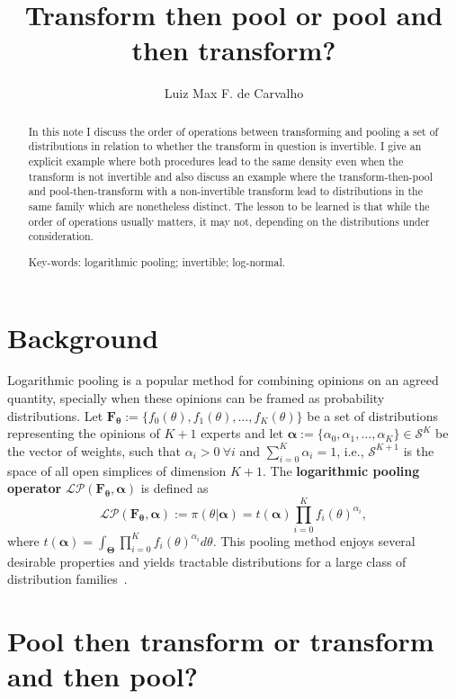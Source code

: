 \documentclass[a4paper, notitlepage, 10pt]{article}
\title{\vspace{-9ex}\centering \bf Transform then pool or pool and then transform?}
\author{
Luiz Max F. de Carvalho\\
}
\begin{document}
\maketitle

\begin{abstract}
In this note I discuss the order of operations between transforming and pooling a set of distributions in relation to whether the transform in question is invertible.
I give an explicit example where both procedures lead to the same density even when the transform is not invertible and also discuss an example where the transform-then-pool and pool-then-transform with a non-invertible transform lead to distributions in the same family which are nonetheless distinct.
The lesson to be learned is that while the order of operations usually matters, it may not, depending on the distributions under consideration.

Key-words: logarithmic pooling; invertible; log-normal. 
\end{abstract}

\section*{Background}

Logarithmic pooling is a popular method for combining opinions on an agreed quantity, specially when these opinions can be framed as probability distributions.
Let $\mathbf{F_\theta} := \{f_0(\theta), f_1(\theta), \ldots, f_K(\theta)\}$ be a set of distributions representing the opinions of $K + 1$ experts and let $\boldsymbol\alpha :=\{\alpha_0, \alpha_1, \ldots, \alpha_K \} \in \mathcal{S}^K$ be the vector of weights, such that $\alpha_i > 0\: \forall i$ and $\sum_{i=0}^K \alpha_i = 1$, i.e., $\mathcal{S}^{K + 1}$ is the space of all open simplices of dimension $K + 1$.
The \textbf{logarithmic pooling operator} $\mathcal{LP}(\mathbf{F_\theta}, \boldsymbol\alpha)$ is defined as
\begin{equation}
\label{eq:logpool}
 \mathcal{LP}(\mathbf{F_\theta}, \boldsymbol\alpha) :=  \pi(\theta | \boldsymbol\alpha) = t(\boldsymbol\alpha) \prod_{i=0}^K f_i(\theta)^{\alpha_i},
\end{equation}
where $t(\boldsymbol\alpha) = \int_{\boldsymbol\Theta}\prod_{i=0}^K f_i(\theta)^{\alpha_i}d\theta$.
This pooling method enjoys several desirable properties and yields tractable distributions for a large class of distribution families~\citep{genest1984}.

\section*{Pool then transform or transform and then pool?}
\end{document}
